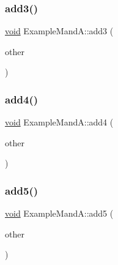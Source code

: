 \mbox{\label{class_example_mand_a_a4fe4eb8f838b1089ed2062d2922e65b0}} 
\subsubsection{\texorpdfstring{add3()}{add3()}}
{\footnotesize\ttfamily \mbox{\hyperlink{_s_d_l__opengles2__gl2ext_8h_ae5d8fa23ad07c48bb609509eae494c95}{void}} Example\+Mand\+A\+::add3 (\begin{DoxyParamCaption}\item[{const \mbox{\hyperlink{class_example_mand_a}{Example\+MandA}} \&}]{other }\end{DoxyParamCaption})\hspace{0.3cm}{\ttfamily [inline]}}

\mbox{\label{class_example_mand_a_a370af4154d5e868e75d80c7cf3b9c6fe}} 
\subsubsection{\texorpdfstring{add4()}{add4()}}
{\footnotesize\ttfamily \mbox{\hyperlink{_s_d_l__opengles2__gl2ext_8h_ae5d8fa23ad07c48bb609509eae494c95}{void}} Example\+Mand\+A\+::add4 (\begin{DoxyParamCaption}\item[{\mbox{\hyperlink{class_example_mand_a}{Example\+MandA}} $\ast$}]{other }\end{DoxyParamCaption})\hspace{0.3cm}{\ttfamily [inline]}}

\mbox{\label{class_example_mand_a_a3c0c9be60a8e9060405a20080f889637}} 
\subsubsection{\texorpdfstring{add5()}{add5()}}
{\footnotesize\ttfamily \mbox{\hyperlink{_s_d_l__opengles2__gl2ext_8h_ae5d8fa23ad07c48bb609509eae494c95}{void}} Example\+Mand\+A\+::add5 (\begin{DoxyParamCaption}\item[{const \mbox{\hyperlink{class_example_mand_a}{Example\+MandA}} $\ast$}]{other }\end{DoxyParamCaption})\hspace{0.3cm}{\ttfamily [inline]}}

